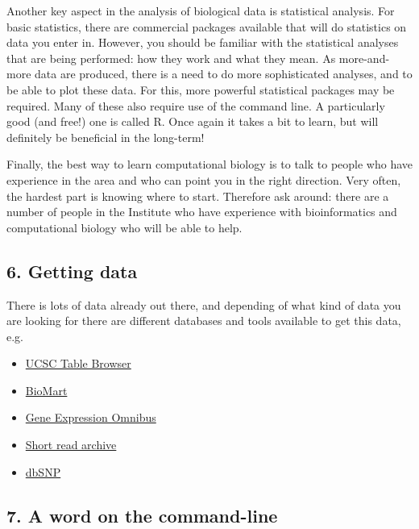 \documentclass[]{article}
\begin{document}
Another key aspect in the analysis of biological data is statistical
analysis. For basic statistics, there are commercial packages available
that will do statistics on data you enter in. However, you should be
familiar with the statistical analyses that are being performed: how
they work and what they mean. As more-and-more data are produced, there
is a need to do more sophisticated analyses, and to be able to plot
these data. For this, more powerful statistical packages may be
required. Many of these also require use of the command line. A
particularly good (and free!) one is called R. Once again it takes a bit
to learn, but will definitely be beneficial in the long-term!

Finally, the best way to learn computational biology is to talk to
people who have experience in the area and who can point you in the
right direction. Very often, the hardest part is knowing where to start.
Therefore ask around: there are a number of people in the Institute who
have experience with bioinformatics and computational biology who will
be able to help.

\subsection{6. Getting data}\label{getting-data}

There is lots of data already out there, and depending of what kind of
data you are looking for there are different databases and tools
available to get this data, e.g.

\begin{itemize}
\itemsep1pt\parskip0pt
\item
  \href{http://genome.ucsc.edu/cgi-bin/hgTables?command=start}{UCSC
  Table Browser}
\item
  \href{http://www.biomart.org/biomart/martview/}{BioMart}
\item
  \href{http://www.ncbi.nlm.nih.gov/geo/}{Gene Expression Omnibus}
\item
  \href{http://www.ncbi.nlm.nih.gov/sra}{Short read archive}
\item
  \href{http://www.ncbi.nlm.nih.gov/snp/}{dbSNP}
\end{itemize}

\subsection{7. A word on the
command-line}\label{a-word-on-the-command-line}
\end{document}

